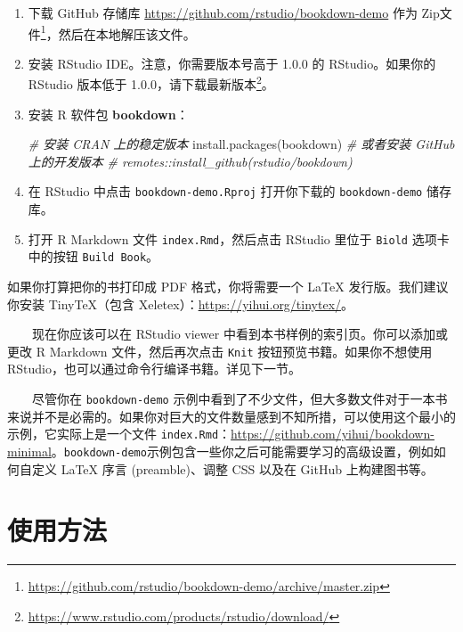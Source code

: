 \documentclass[
  12pt,
]{krantz}
\makeatletter
\newenvironment{Shaded}{\begin{snugshade}}{\end{snugshade}}
\newcommand{\CommentTok}[1]{\textcolor[rgb]{0.56,0.35,0.01}{\textit{#1}}}
\newcommand{\FunctionTok}[1]{\textcolor[rgb]{0.00,0.00,0.00}{#1}}
\newcommand{\NormalTok}[1]{#1}
\newcommand{\StringTok}[1]{\textcolor[rgb]{0.31,0.60,0.02}{#1}}
\renewcommand{\href}[2]{#2\footnote{\url{#1}}}
\newenvironment{kframe}{%
\medskip{}
\setlength{\fboxsep}{.8em}
 \def\at@end@of@kframe{}%
 \ifinner\ifhmode%
  \def\at@end@of@kframe{\end{minipage}}%
  \begin{minipage}{\columnwidth}%
 \fi\fi%
 \def\FrameCommand##1{\hskip\@totalleftmargin \hskip-\fboxsep
 \colorbox{shadecolor}{##1}\hskip-\fboxsep
     \hskip-\linewidth \hskip-\@totalleftmargin \hskip\columnwidth}%
 \MakeFramed {\advance\hsize-\width
   \@totalleftmargin\z@ \linewidth\hsize
   \@setminipage}}%
 {\par\unskip\endMakeFramed%
 \at@end@of@kframe}
\newenvironment{rmdblock}[1]
  {
  \begin{itemize}
  \renewcommand{\labelitemi}{
    \raisebox{-.7\height}[0pt][0pt]{
      {\setkeys{Gin}{width=3em,keepaspectratio}\texttt{[image: images/\#1]}}
    }
  }
  \setlength{\fboxsep}{1em}
  \begin{kframe}
  \item
  }
  {
  \end{kframe}
  \end{itemize}
  }
\newenvironment{rmdnote}
  {\begin{rmdblock}{note}}
  {\end{rmdblock}}
\theoremstyle{definition}
\theoremstyle{definition}
\theoremstyle{definition}
\theoremstyle{definition}
\theoremstyle{remark}
\makeatother
\begin{document}
\begin{enumerate}
\def\labelenumi{\arabic{enumi}.}
\item
  下载 GitHub 存储库 \url{https://github.com/rstudio/bookdown-demo} 作为 \href{https://github.com/rstudio/bookdown-demo/archive/master.zip}{Zip文件}，然后在本地解压该文件。
\item
  安装 RStudio IDE。注意，你需要版本号高于 1.0.0 的 RStudio。如果你的 RStudio 版本低于 1.0.0，请\href{https://www.rstudio.com/products/rstudio/download/}{下载最新版本}。
\item
  安装 R 软件包 \textbf{bookdown}：

\begin{Shaded}
\begin{Highlighting}[]
\CommentTok{\# 安装 CRAN 上的稳定版本}
\FunctionTok{install.packages}\NormalTok{(}\StringTok{\textquotesingle{}bookdown\textquotesingle{}}\NormalTok{)}
\CommentTok{\# 或者安装 GitHub 上的开发版本}
\CommentTok{\# remotes::install\_github(\textquotesingle{}rstudio/bookdown\textquotesingle{})}
\end{Highlighting}
\end{Shaded}
\item
  在 RStudio 中点击 \texttt{bookdown-demo.Rproj} 打开你下载的 \texttt{bookdown-demo} 储存库。
\item
  打开 R Markdown 文件 \texttt{index.Rmd}，然后点击 RStudio 里位于 \texttt{Biold} 选项卡中的按钮 \texttt{Build\ Book}。
\end{enumerate}

\begin{rmdnote}
如果你打算把你的书打印成 PDF 格式，你将需要一个 LaTeX 发行版。我们建议你安装 TinyTeX（包含 Xeletex）：\url{https://yihui.org/tinytex/}。
\end{rmdnote}

  现在你应该可以在 RStudio viewer 中看到本书样例的索引页。你可以添加或更改 R Markdown 文件，然后再次点击 \texttt{Knit} 按钮预览书籍。如果你不想使用 RStudio，也可以通过命令行编译书籍。详见下一节。

  尽管你在 \texttt{bookdown-demo} 示例中看到了不少文件，但大多数文件对于一本书来说并不是必需的。如果你对巨大的文件数量感到不知所措，可以使用这个最小的示例，它实际上是一个文件 \texttt{index.Rmd}：\url{https://github.com/yihui/bookdown-minimal}。\texttt{bookdown-demo}示例包含一些你之后可能需要学习的高级设置，例如如何自定义 LaTeX 序言 (preamble)、调整 CSS 以及在 GitHub 上构建图书等。

\hypertarget{usage}{%
\section{使用方法}\label{usage}}
\end{document}
